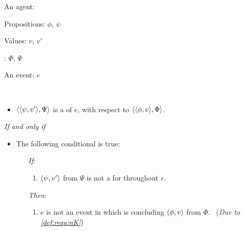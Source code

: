 \begin{note}
  \begin{definition}[A \requ{0}]
    \label{def:requ}
    \begin{itemize*}[noitemsep, label=\(\circ\)]
    \item
      An agent: \vAgent{}
    \item
      Propositions: \(\phi\), \(\psi\)
    \item
      Values: \(v\), \(v'\)
    \item
      : \(\Phi\), \(\Psi\)
    \item
      An event: \(e\)
    \item
      \mbox{ }
    \end{itemize*}

    \begin{itemize}
    \item
      \(\langle \langle \psi, v' \rangle, \Psi \rangle\) is a \emph{\requ{}} of \(e\), with respect to \(\langle \langle \phi, v \rangle, \Phi \rangle\).
    \end{itemize}

    \emph{If and only if}

    \begin{itemize}
    \item
      The following conditional is true:
      \begin{itemize}
      \item[\emph{If}:]
        \begin{enumerate}[label=\alph*., ref=(\alph*), series=requDefSeries]
        \item
          \label{def:requ:nK}
          \(\langle \psi, v' \rangle\) from \(\Psi\) is not a \fc{} for \vAgent{} throughout \(e\).
        \end{enumerate}
      \item[\emph{Then}:]
        \begin{enumerate}[label=\alph*., ref=(\alph*), resume*=requDefSeries]
        \item
          \label{def:requ:nC}
          \(e\) is not an event in which \vAgent{} is concluding \(\langle \phi, v \rangle\) from \(\Phi\).\newline
          \mbox{ }\hfill(\emph{Due to \ref{def:requ:nK}})
        \end{enumerate}
      \end{itemize}
    \end{itemize}
    \vspace{-\baselineskip}
  \end{definition}
\end{note}

